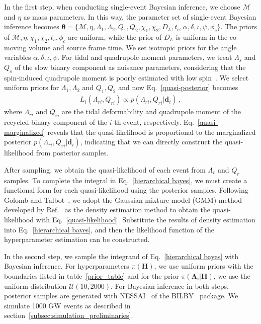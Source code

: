 \documentclass[a4paper,11pt]{article}
\begin{document}
In the first step, when conducting single-event Bayesian inference, we choose $\mathcal{M}$ and $\eta$ as mass parameters. In this way, the parameter set of single-event Bayesian inference becomes $\bm{\theta} = \{\mathcal{M},\eta,\Lambda_1,\Lambda_2,Q_1,Q_2,\chi_1,\chi_2,D_L,t_c,\alpha,\delta,\iota,\psi,\phi_c\}$. The priors of $\mathcal{M},\eta,\chi_1,\chi_2,t_c,\phi_c$ are uniform, while the prior of $D_L$ is uniform in the co-moving volume and source frame time. We set isotropic priors for the angle variables $\alpha,\delta,\iota,\psi$. For tidal and quadrupole moment parameters, we treat $\Lambda_s$ and $Q_s$ of the slow binary component as nuisance parameters, considering that the spin-induced quadrupole moment is poorly estimated with low spin~\cite{Yagi:2013awa}. We select uniform priors for $\Lambda_1,\Lambda_2$ and $Q_1,Q_2$ and now Eq.~\eqref{quasi-posterior} becomes
\begin{equation}
    \label{quasi-marginalized1}
    \begin{aligned}
        L_i(\Lambda_{ri},Q_{ri}) \propto p(\Lambda_{ri},Q_{ri}|\bm{d}_i)\,,
    \end{aligned}  
\end{equation}
where $\Lambda_{ri}$ and $Q_{ri}$ are the tidal deformability and quadrupole moment of the recycled binary component of the $i$-th event, respectively. Eq.~\eqref{quasi-marginalized} reveals that the quasi-likelihood is proportional to the marginalized posterior $p(\Lambda_{ri},Q_{ri}|\bm{d}_i)$, indicating that we can directly construct the quasi-likelihood from posterior samples.

After sampling, we obtain the quasi-likelihood of each event from $\Lambda_r$ and $Q_r$ samples. To complete the integral in Eq.~\eqref{hierarchical bayes}, we must create a functional form for each quasi-likelihood using the posterior samples. Following Golomb and Talbot~\cite{Golomb:2021tll}, we adopt the Gaussian mixture model (GMM) method developed by Ref.~\cite{Talbot:2020oeu} as the density estimation method to obtain the quasi-likelihood with Eq.~\eqref{quasi-likelihood}. Substitute the results of density estimation into Eq.~\eqref{hierarchical bayes}, and then the likelihood function of the hyperparameter estimation can be constructed.

In the second step, we sample the integrand of Eq.~\eqref{hierarchical bayes} with Bayesian inference. For hyperparameters $\pi(\bm{H})$, we use uniform priors with the boundaries listed in table~\ref{prior_table} and for the prior $\pi(\bm{\Lambda}_i|\bm{H})$, we use the uniform distribution $\mathcal{U}(10,2000)$. For Bayesian inference in both steps, posterior samples are generated with {\sc NESSAI}~\cite{Skilling:2004pqw,Skilling:2006gxv,michael_j_williams_2025_14627250,PhysRevD.103.103006,Williams:2023ppp} of the {\sc BILBY}~\cite{Ashton:2018jfp} package. We simulate 1000 GW events as described in section~\ref{subsec:simulation_preliminaries}. 
\end{document}
